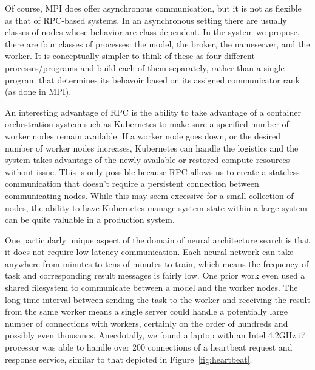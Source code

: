 \documentclass[conference]{IEEEtran}
\begin{document}
Of course,
MPI does offer asynchronous communication, but it is not as flexible as that of
RPC-based systems. In an asynchronous setting there are usually classes of nodes
whose behavior are class-dependent. In the system we propose, there are four
classes of processes: the model, the broker, the nameserver, and the worker. It
is conceptually simpler to think of these as four different processes/programs
and build each of them separately, rather than a single program that determines
its behavoir based on its assigned communicator rank (as done in MPI).

An interesting advantage of RPC is the ability to take advantage of a container
orchestration system such as Kubernetes \cite{43826} to make sure a specified
number of worker nodes remain available. If a worker node goes down, or the
desired number of worker nodes increases, Kubernetes can handle the logistics
and the system takes advantage of the newly available or restored compute
resources without issue. This is only possible because RPC allows us to
create a stateless communication that doesn't require a persistent connection
between communicating nodes. While this may seem excessive for a small collection
of nodes, the ability to have Kubernetes manage system state within a large
system can be quite valuable in a production system.

One particularly unique aspect of the domain of neural architecture search is
that it does not require low-latency communication. Each neural network can take
anywhere from minutes to tens of minutes to train, which means the frequency of
task and corresponding result messages is fairly low. One prior work
\cite{DBLP:conf/icml/RealMSSSTLK17} even used a shared filesystem to communicate
between a model and the worker nodes. The long time interval between sending the
task to the worker and receiving the result from the same worker means a single
server could handle a potentially large number of connections with workers,
certainly on the order of hundreds and possibly even thousancs. Anecdotally, we
found a laptop with an Intel 4.2GHz i7 processor was able to handle over 200
connections of a heartbeat request and response service, similar to that
depicted in Figure~\ref{fig:heartbeat}.
\end{document}
